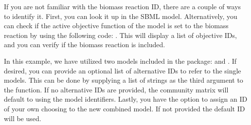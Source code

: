 \documentclass[letterpaper,10pt,english]{sphinxmanual}
\begin{document}
\begin{sphinxVerbatim}[commandchars=\\\{\}]
 
   

  
  

  
  
   
    \PYG{p}{[} \PYG{p}{]}
    \PYG{p}{[}
    \PYG{p}{]}
\end{sphinxVerbatim}

\sphinxAtStartPar
If you are not familiar with the biomass reaction ID, there are a couple of ways to identify it.
First, you can look it up in the SBML model. Alternatively, you can check if the active objective function of the model is
set to the biomass reaction by using the following code: .
This will display a list of objective IDs, and you can verify if the biomass reaction is included.

\sphinxAtStartPar
In this example, we have utilized two models included in the package: 
and . If desired, you can provide an optional list of alternative IDs to refer to the single models.
This can be done by supplying a list of strings as the third argument to the function.
If no alternative IDs are provided, the community matrix will default to using the model identifiers.
Lastly, you have the option to assign an ID of your own choosing to the new combined model. If not provided the default ID will be used.
\end{document}
